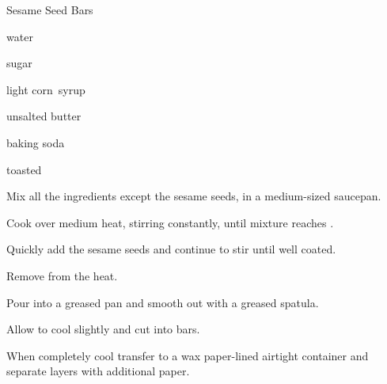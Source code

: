 \begin{recipe}{Sesame Seed Bars}{}{}

\begin{ingredients}
\item {} water
\item {} sugar
\item {} light corn~syrup
\item {} unsalted butter
\item \tp{\quarter} baking soda
\item {} toasted 
\end{ingredients}

\begin{directions}
\item Mix all the ingredients except the sesame seeds, in a medium-sized saucepan.
\item Cook over medium heat, stirring constantly, until mixture reaches .
\item Quickly add the sesame seeds and continue to stir until well coated.
\item Remove from the heat.
\item Pour into a greased pan and smooth out with a greased spatula.
\item Allow to cool slightly and cut into bars.
\item When completely cool transfer to a wax paper-lined airtight container and separate layers with additional paper.
\end{directions}
\end{recipe}
